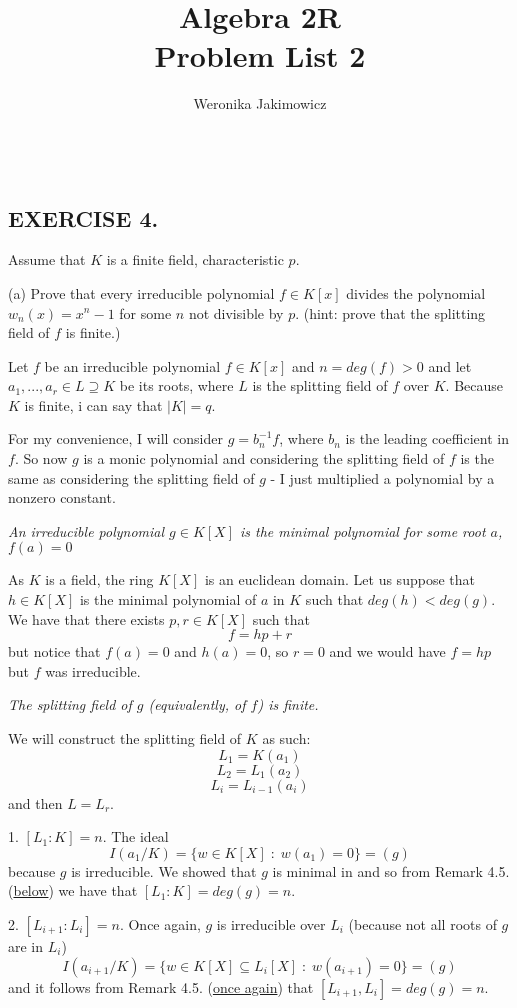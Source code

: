 \documentclass{article}
\title{\large Algebra 2R\smallskip\\ \textbf{Problem List 2}}
\author{\normalsize Weronika Jakimowicz}
\date{~~~}
\begin{document}
\maketitle\thispagestyle{empty}

\subsection*{EXERCISE 4.}
{\color{pink}Assume that $K$ is a finite field, characteristic $p$.

(a) Prove that every irreducible polynomial $f\in K[x]$ divides the polynomial $w_n(x)=x^n-1$ for some $n$ not divisible by $p$. (hint: prove that the splitting field of $f$ is finite.)}

Let $f$ be an irreducible polynomial $f\in K[x]$ and $n=deg(f)>0$ and let $a_1,...,a_r\in L\supseteq K$ be its roots, where $L$ is the splitting field of $f$ over $K$. Because $K$ is finite, i can say that $|K|=q$.

For my convenience, I will consider $g=b_n^{-1}f$, where $b_n$ is the leading coefficient in $f$. So now $g$ is a monic polynomial and considering the splitting field of $f$ is the same as considering the splitting field of $g$ - I just multiplied a polynomial by a nonzero constant.
\smallskip

\label{lemaczysko}
 \emph{An irreducible polynomial $g\in K[X]$ is the minimal polynomial for some root $a$, $f(a)=0$}

As $K$ is a field, the ring $K[X]$ is an euclidean domain. Let us suppose that $h\in K[X]$ is the minimal polynomial of $a$ in $K$ such that $deg(h)<deg(g)$. We have that there exists $p,r\in K[X]$ such that
$$f=hp+r$$
but notice that $f(a)=0$ and $h(a)=0$, so $r=0$ and we would have $f=hp$ but $f$ was irreducible.
\medskip

\emph{ The splitting field of $g$ (equivalently, of $f$) is finite.}

We will construct the splitting field of $K$ as such:
$$L_1=K(a_1)$$
$$L_2=L_1(a_2)$$
$$L_i=L_{i-1}(a_i)$$
and then $L=L_r$.

1. $[L_1:K] = n$. The ideal
$$I(a_1/K)=\{w\in K[X]\;:\;w(a_1)=0\}=(g)$$
because $g$ is irreducible. We showed that $g$ is minimal in \hyperref[lemaczysko]{} and so from Remark 4.5. (\hyperref[remark:4:5]{below}) we have that $[L_1:K]=deg(g)=n$.

2. $[L_{i+1}:L_i] = n$. Once again, $g$ is irreducible over $L_{i}$ (because not all roots of $g$ are in $L_i$)
$$I(a_{i+1}/K)=\{w\in K[X]\subseteq L_i[X]\;:\;w(a_{i+1})=0\}=(g)$$
and it follows from Remark 4.5. (\hyperref[remark:4:5]{once again}) that $[L_{i+1},L_i]=deg(g)=n$.
\medskip
\end{document}
